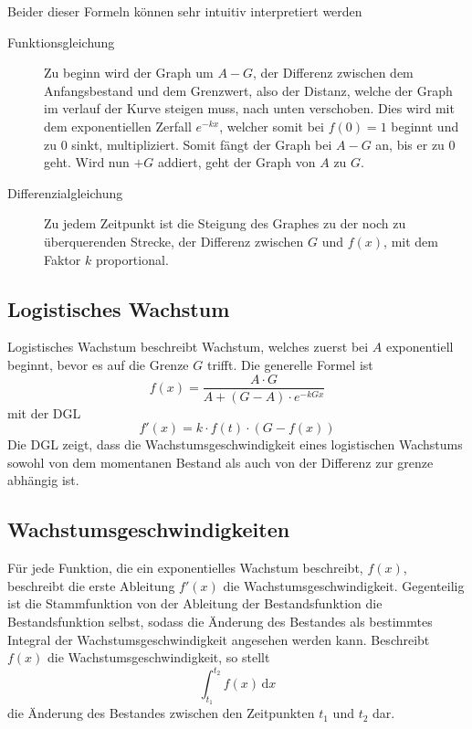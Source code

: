 \documentclass{article}
\begin{document}
\vspace{1em} 
\noindent Beider dieser Formeln können sehr intuitiv interpretiert werden 
\begin{description}
 \item[Funktionsgleichung] Zu beginn wird der Graph um $A-G$, der Differenz zwischen dem Anfangsbestand und dem Grenzwert, also der Distanz, welche der Graph im verlauf der Kurve steigen muss, nach unten verschoben. Dies wird mit dem exponentiellen Zerfall $e^{-kx}$, welcher somit bei $f(0)=1$ beginnt und zu $0$ sinkt, multipliziert. Somit fängt der Graph bei $A-G$ an, bis er zu $0$ geht. Wird nun $+G$ addiert, geht der Graph von $A$ zu $G$.
 \item[Differenzialgleichung] Zu jedem Zeitpunkt ist die Steigung des Graphes zu der noch zu überquerenden Strecke, der Differenz zwischen $G$ und $f(x)$, mit dem Faktor $k$ proportional.
\end{description} 
 
\subsection{Logistisches Wachstum} 
\begin{minipage}{6cm}
  \centering
\end{minipage}
\hfill
\begin{minipage}{\dimexpr\textwidth-6cm}  
Logistisches Wachstum beschreibt Wachstum, welches zuerst bei $A$ exponentiell beginnt, bevor es auf die Grenze $G$ trifft.
Die generelle Formel ist
\[
 f(x) = \frac{A \cdot G}{A+(G-A) \cdot e^{-kGx}}
\]
mit der DGL
\[
 f'(x) = k \cdot f(t) \cdot (G-f(x))
\]
Die DGL zeigt, dass die Wachstumsgeschwindigkeit eines logistischen Wachstums sowohl von dem momentanen Bestand als auch von der Differenz zur grenze abhängig ist.
\end{minipage} 
 
\subsection{Wachstumsgeschwindigkeiten}
Für jede Funktion, die ein exponentielles Wachstum beschreibt, $f(x)$, beschreibt die erste Ableitung $f'(x)$ die Wachstumsgeschwindigkeit. \newline
Gegenteilig ist die Stammfunktion von der Ableitung der Bestandsfunktion die Bestandsfunktion selbst, sodass die Änderung des Bestandes als bestimmtes Integral der Wachstumsgeschwindigkeit angesehen werden kann. Beschreibt $f(x)$ die Wachstumsgeschwindigkeit, so stellt
\[
 \int_{t_1}^{t_2} f(x) \,\mathrm{d}x 
\]
die Änderung des Bestandes zwischen den Zeitpunkten $t_1$ und $t_2$ dar. 
 
\end{document}
